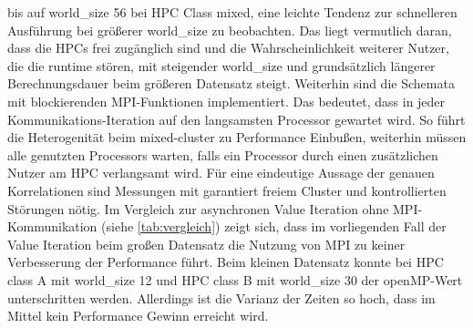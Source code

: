 bis auf world\_size 56 bei HPC Class mixed, eine leichte Tendenz zur schnelleren Ausführung bei größerer world\_size zu beobachten. Das liegt vermutlich daran, dass die HPCs frei zugänglich sind und die Wahrscheinlichkeit weiterer Nutzer, die die runtime stören, mit steigender world\_size und grundsätzlich längerer Berechnungsdauer beim größeren Datensatz steigt. Weiterhin sind die Schemata mit blockierenden MPI-Funktionen implementiert. Das bedeutet, dass in jeder Kommunikations-Iteration auf den langsamsten Processor gewartet wird. So führt die Heterogenität beim mixed-cluster zu Performance Einbußen, weiterhin müssen alle genutzten Processors warten, falls ein Processor durch einen zusätzlichen Nutzer am HPC verlangsamt wird. Für eine eindeutige Aussage der genauen Korrelationen sind Messungen mit garantiert freiem Cluster und kontrollierten Störungen nötig. Im Vergleich zur asynchronen Value Iteration ohne MPI-Kommunikation (siehe \autoref{tab:vergleich}) zeigt sich, dass im vorliegenden Fall der Value Iteration beim großen Datensatz die Nutzung von MPI zu keiner Verbesserung der Performance führt. Beim kleinen Datensatz konnte bei HPC class A mit world\_size 12 und HPC class B mit world\_size 30 der openMP-Wert unterschritten werden. Allerdings ist die Varianz der Zeiten so hoch, dass im Mittel kein Performance Gewinn erreicht wird.

\begin{table}[h]
    \caption{Vergleich der runtime von openMP und MPI}
\end{table}